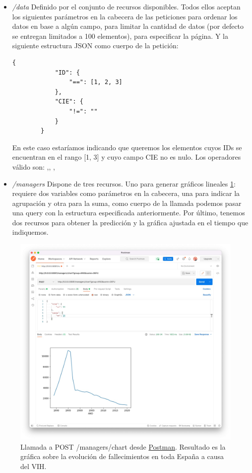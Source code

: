 \begin{itemize}
    \item \textit{/data} Definido por el conjunto de recursos disponibles. Todos ellos
    aceptan los siguientes parámetros en la cabecera de las peticiones 
    para ordenar los datos en base a algún campo,  para limitar la
    cantidad de datos (por defecto se entregan limitados a 100 elementos), 
    para especificar la página. Y la siguiente estructura JSON como cuerpo de la petición:
    \begin{lstlisting}[caption=Body de una posible petición a POST /data/diceases] 
        { 
            "ID": {  
                "==": [1, 2, 3] 
            }, 
            "CIE": { 
                "!=": "" 
            } 
        }
    \end{lstlisting}
    En este caso estaríamos indicando que queremos los elementos cuyos IDs se encuentran
    en el rango [1, 3] y cuyo campo CIE no es nulo. Los operadores válido son:
    \codeword{==},\codeword{!=}, \codeword{<}, \codeword{>}

    \item \textit{/managers} Dispone de tres recursos. Uno para generar gráficos lineales
    \ref{fig:graficos-api}: requiere dos variables como parámetros en la cabecera, una
    para indicar la agrupación y otra para la suma, como cuerpo de la llamada podemos
    pasar una query con la estructura especificada anteriormente. Por último, tenemos dos
    recursos para obtener la predicción y la gráfica ajustada en el tiempo que indiquemos.
\end{itemize}

\FloatBarrier
\begin{figure}[h]
	\centering	
	\includegraphics[width=\textwidth]{doc/logos/imgs/api-managers.jpg}
	\caption{ Llamada a POST /managers/chart desde
	\href{https://www.postman.com/}{Postman}. Resultado es la gráfica sobre la evolución
	de fallecimientos en toda España a causa del VIH. }
    \label{fig:graficos-api}
\end{figure}
\FloatBarrier


